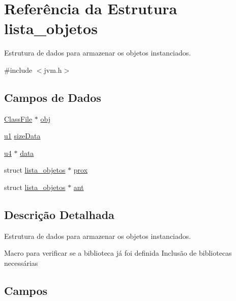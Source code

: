 \hypertarget{structlista__objetos}{}\section{Referência da Estrutura lista\+\_\+objetos}
\label{structlista__objetos}


Estrutura de dados para armazenar os objetos instanciados.  




{\ttfamily \#include $<$jvm.\+h$>$}

\subsection*{Campos de Dados}
\begin{DoxyCompactItemize}
\item 
\hyperlink{classFileStruct_8h_aed419e54ca9f7e5ab3b22a3036af9993}{Class\+File} $\ast$ \hyperlink{structlista__objetos_a286f79d3a16de36ff111dbebe04db45e}{obj}
\item 
\hyperlink{lista__operandos_8h_ad9f4cdb6757615aae2fad89dab3c5470}{u1} \hyperlink{structlista__objetos_a699c168fb6c1ae4a32c6f4fac1bfe4e7}{size\+Data}
\item 
\hyperlink{lista__operandos_8h_ae5be1f726785414dd1b77d60df074c9d}{u4} $\ast$ \hyperlink{structlista__objetos_a4894afdae147a8afe842ff6d52b95baf}{data}
\item 
struct \hyperlink{structlista__objetos}{lista\+\_\+objetos} $\ast$ \hyperlink{structlista__objetos_ace56ba58679d56ce8efbf2e144892d83}{prox}
\item 
struct \hyperlink{structlista__objetos}{lista\+\_\+objetos} $\ast$ \hyperlink{structlista__objetos_ae4e38254fa73e644ba9c1c52a8eab1cf}{ant}
\end{DoxyCompactItemize}


\subsection{Descrição Detalhada}
Estrutura de dados para armazenar os objetos instanciados. 

Macro para verificar se a biblioteca já foi definida Inclusão de bibliotecas necessárias 

\subsection{Campos}
